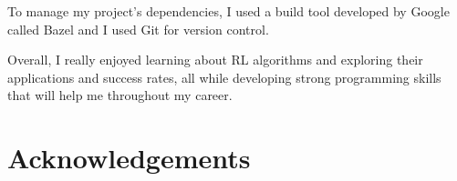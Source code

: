 \documentclass[11pt,a4paper]{report}
\begin{document}
To manage my project’s dependencies, I used a build tool developed by Google called Bazel and I used Git for version control.

Overall, I really enjoyed learning about RL algorithms and exploring their applications and success rates, all while developing strong programming skills that will help me throughout my career.


\chapter{Acknowledgements}



{}

\end{document}
